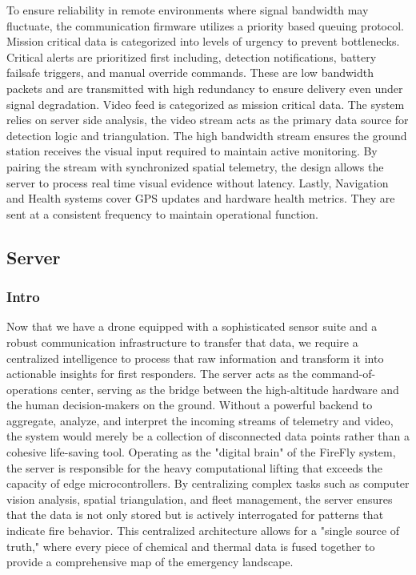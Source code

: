 \documentclass[journal, onecolumn]{IEEEtran}
\begin{document}
To ensure reliability in remote environments where signal bandwidth may fluctuate, the communication firmware utilizes a priority based queuing protocol. Mission critical data is categorized into levels of urgency to prevent bottlenecks. Critical alerts are prioritized first including, detection notifications, battery failsafe triggers, and manual override commands. These are low bandwidth packets and are transmitted with high redundancy to ensure delivery even under signal degradation.
Video feed is categorized as mission critical data. The system relies on server side analysis, the video stream acts as the primary data source for detection logic and triangulation. The high bandwidth stream ensures the ground station receives the visual input required to maintain active monitoring. By pairing the stream with synchronized spatial telemetry, the design allows the server to process real time visual evidence without latency. Lastly, Navigation and Health systems cover GPS updates and hardware health metrics. They are sent at a consistent frequency to maintain operational function. 

\subsection{Server} 
\subsubsection{Intro}
Now that we have a drone equipped with a sophisticated sensor suite and a robust communication infrastructure to transfer that data, we require a centralized intelligence to process that raw information and transform it into actionable insights for first responders. The server acts as the command-of-operations center, serving as the bridge between the high-altitude hardware and the human decision-makers on the ground. Without a powerful backend to aggregate, analyze, and interpret the incoming streams of telemetry and video, the system would merely be a collection of disconnected data points rather than a cohesive life-saving tool.
Operating as the "digital brain" of the FireFly system, the server is responsible for the heavy computational lifting that exceeds the capacity of edge microcontrollers. By centralizing complex tasks such as computer vision analysis, spatial triangulation, and fleet management, the server ensures that the data is not only stored but is actively interrogated for patterns that indicate fire behavior. This centralized architecture allows for a "single source of truth," where every piece of chemical and thermal data is fused together to provide a comprehensive map of the emergency landscape.
\end{document}
